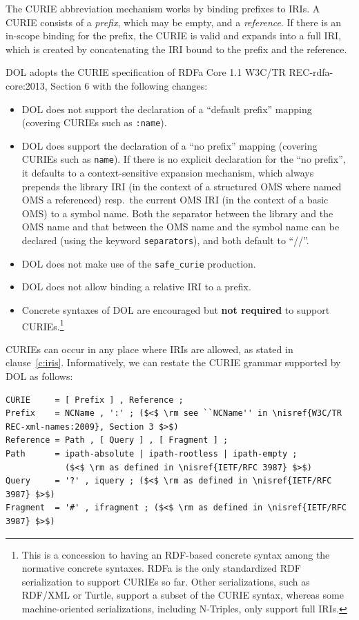 \documentclass[10pt,fleqn,%
\ifpretendfinal
final%
\else
draft%
\fi,
]{scrreprt}
\makeatletter
\newcommand{\red}[1]{#1} %
\newcommand*\CommentAuthor{}
\renewcommand*\CommentAuthor{#1}}
\newcommand*\CommentDate{}
\renewcommand*\CommentDate{#1}}
\newcommand*\CommentId{}
\renewcommand*\CommentId{#1}}
\newcommand*\CommentType{}
\renewcommand*\CommentType{#1}}
\newcommand*{\SetCommentColorByType}[1]{%
\edef\localType{{#1}}%
\expandafter\ifstrequal\localType{q-aut}{\colorlet{CommentColor}{red}}{%
\expandafter\ifstrequal\localType{q-all}{\colorlet{CommentColor}{orange}}{%
\expandafter\ifstrequal\localType{todo}{\colorlet{CommentColor}{orange}}{%
\expandafter\ifstrequal\localType{fyi}{\colorlet{CommentColor}{lightgray}}{%
\colorlet{CommentColor}{yellow}}}}}}
\newcommand*{\SetCommentPrefixByType}[1]{%
\edef\localType{{#1}}%
\expandafter\@ifmtarg\localType{%
\edef\CommentPrefix{}%
}{%
\caseupper[q]{#1}%
\edef\CommentPrefix{\thestring: }%
}}
\newcommand*{\initComment}[1]{%
\setkeys{Comment}{#1}%
\SetCommentColorByType{\CommentType}%
\relax%
\SetCommentPrefixByType{\CommentType}%
\relax%
}
\newcommand*{\todonote}[2][]{%
\initComment{#1}%
\pdfcomment[author=\CommentAuthor,color=CommentColor,date=\CommentDate,id=\CommentId]{%
\CommentPrefix
#2}}
\renewcommand*{\todonote}[2][]{%
\initComment{#1}%
\ednote{\CommentPrefix #2}}
\newcommand*{\CLnote}[2][author=Christoph Lange]{%
\todonote[author=Christoph Lange,#1]{#2} 
}
\newcommand*{\syntax}[1]{\texttt{#1}}
\newcommand*{\notrequired}{\textbf{not required}\xspace}
\newcommand{\clauserefname}{clause}
\newcommand{\cref}[1]{\clauserefname~\ref{#1}}
\newcommand{\nisref}[1]{#1}
\makeatother
\begin{document}
The CURIE abbreviation mechanism works by binding prefixes to IRIs.  A CURIE consists of a 
\emph{prefix}, which may be empty, and a \emph{reference}.  If there is an in-scope binding for the 
prefix, the CURIE is valid and expands into a full IRI, which is created by concatenating the IRI 
bound to the prefix and the reference.

DOL adopts the CURIE specification of RDFa Core 1.1 \nisref{W3C/TR REC-rdfa-core:2013, Section 6} with the following changes:
\begin{itemize}
\item DOL does not support the declaration of a ``default prefix'' mapping %
(covering CURIEs such as \syntax{:name}).
\item DOL does support the declaration  of a ``no prefix'' mapping (covering CURIEs such as 
\syntax{name}). \red{If there is no explicit declaration for the ``no prefix'', it defaults to a 
context-sensitive expansion mechanism, which always prepends the library IRI (in the context of a 
structured OMS where named OMS a referenced) resp.\ the current OMS IRI (in the context of a basic 
OMS) to a symbol name. Both the separator between the library and the OMS name and that between the 
OMS name and the symbol name can be declared (using the keyword \syntax{separators}), and both default to ``//''.}

\item DOL does not make use of the \syntax{safe\_curie} production.
\item DOL does not allow binding a relative IRI to a prefix.
\item Concrete syntaxes of DOL are encouraged but \notrequired to support CURIEs.\footnote{This is 
a concession to having an RDF-based concrete syntax among the normative concrete syntaxes.  RDFa is 
the only standardized RDF serialization to support CURIEs so far.  Other serializations, such as 
RDF/XML or Turtle, support a subset of the CURIE syntax, whereas some machine-oriented 
serializations, including N-Triples, only support full IRIs.}
\end{itemize}

CURIEs can occur in any place where IRIs are allowed, as stated in \cref{c:iris}.  Informatively, 
we can restate the CURIE grammar supported by DOL as follows:
\begin{lstlisting}[language=ebnf,escapeinside={()}]
CURIE     = [ Prefix ] , Reference ;
Prefix    = NCName , ':' ; ($<$ \rm see ``NCName'' in \nisref{W3C/TR REC-xml-names:2009}, Section 3 $>$) 
Reference = Path , [ Query ] , [ Fragment ] ;
Path      = ipath-absolute | ipath-rootless | ipath-empty ;
            ($<$ \rm as defined in \nisref{IETF/RFC 3987} $>$) 
Query     = '?' , iquery ; ($<$ \rm as defined in \nisref{IETF/RFC 3987} $>$) 
Fragment  = '#' , ifragment ; ($<$ \rm as defined in \nisref{IETF/RFC 3987} $>$) 
\end{lstlisting}
\end{document}
